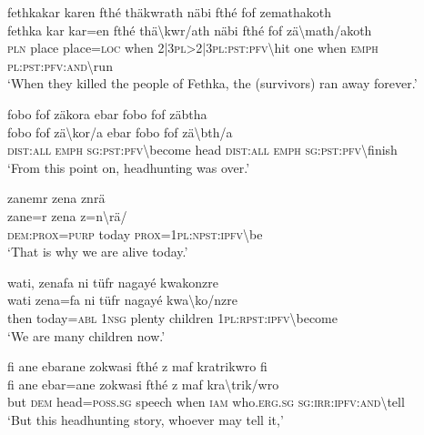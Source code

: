 \ea\label{ex:4:a1785}
fethkakar karen fthé thäkwrath näbi fthé fof zemathakoth\\
\gll fethka	kar	kar=en	fthé	thä{\textbackslash}kwr/ath	näbi	fthé	fof	zä{\textbackslash}math/akoth\\
     \textsc{pln}	place	place=\textsc{loc}	when	2|3\textsc{pl}>2|3\textsc{pl}:\textsc{pst}:\textsc{pfv}{\textbackslash}hit	one	when	\textsc{emph}	\textsc{pl}:\textsc{pst}:\textsc{pfv}:\textsc{and}{\textbackslash}run\\
\glt `When they killed the people of Fethka, the (survivors) ran away forever.'
\z

\ea\label{ex:4:a1786}
fobo fof zäkora ebar fobo fof zäbtha\\
\gll fobo	fof	zä{\textbackslash}kor/a	ebar	fobo	fof	zä{\textbackslash}bth/a\\
     \textsc{dist}:\textsc{all}	\textsc{emph}	\textsc{sg}:\textsc{pst}:\textsc{pfv}{\textbackslash}become	head	\textsc{dist}:\textsc{all}	\textsc{emph}	\textsc{sg}:\textsc{pst}:\textsc{pfv}{\textbackslash}finish\\
\glt `From this point on, headhunting was over.'
\z

\ea\label{ex:4:a1788}
zanemr zena znrä\\
\gll zane=r	zena	z=n{\textbackslash}rä/\\
     \textsc{dem}:\textsc{prox}=\textsc{purp}	today	\textsc{prox}=1\textsc{pl}:\textsc{npst}:\textsc{ipfv}{\textbackslash}be\\
\glt `That is why we are alive today.'
\z

\ea\label{ex:4:a1789}
wati, zenafa ni tüfr nagayé kwakonzre\\
\gll wati	zena=fa	ni	tüfr	nagayé	kwa{\textbackslash}ko/nzre\\
     then	today=\textsc{abl}	1\textsc{nsg}	plenty	children	1\textsc{pl}:\textsc{rpst}:\textsc{ipfv}{\textbackslash}become\\
\glt `We are many children now.'
\z

\ea\label{ex:4:a1791}
fi ane ebarane   zokwasi fthé z maf kratrikwro fi\\
\gll fi	ane	ebar=ane	zokwasi	fthé	z	maf	kra{\textbackslash}trik/wro\\
     but	\textsc{dem}	head=\textsc{poss}.\textsc{sg}	speech	when	\textsc{iam}	who.\textsc{erg}.\textsc{sg}	\textsc{sg}:\textsc{irr}:\textsc{ipfv}:\textsc{and}{\textbackslash}tell\\
\glt `But this headhunting story, whoever may tell it,'
\z

